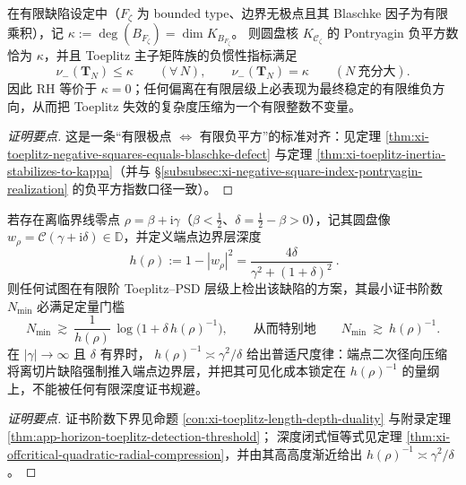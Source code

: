 \begin{conclusion}\label{con:xi-toeplitz-negative-square-stability-law}
在有限缺陷设定中（\(F_{\zeta}\) 为 bounded type、边界无极点且其 Blaschke 因子为有限乘积），记
\(\kappa:=\deg(B_{F_{\zeta}})=\dim K_{B_{F_{\zeta}}}\)。
则圆盘核 \(K_{\mathscr{C}_{\zeta}}\) 的 Pontryagin 负平方数恰为 \(\kappa\)，并且 Toeplitz 主子矩阵族的负惯性指标满足
\[
\nu_-(\mathbf{T}_N)\le \kappa\qquad(\forall\,N),
\qquad
\nu_-(\mathbf{T}_N)=\kappa\qquad(N\ \text{充分大}).
\]
因此 RH 等价于 \(\kappa=0\)；任何偏离在有限层级上必表现为最终稳定的有限维负方向，从而把 Toeplitz 失效的复杂度压缩为一个有限整数不变量。
\end{conclusion}
\begin{proof}[证明要点]
这是一条“有限极点 \(\Longleftrightarrow\) 有限负平方”的标准对齐：见定理 \ref{thm:xi-toeplitz-negative-squares-equals-blaschke-defect} 与定理 \ref{thm:xi-toeplitz-inertia-stabilizes-to-kappa}（并与 \S\ref{subsubsec:xi-negative-square-index-pontryagin-realization} 的负平方指数口径一致）。
\end{proof}

\begin{conclusion}\label{con:xi-endpoint-visibility-lower-bound-toeplitz-order}
若存在离临界线零点 \(\rho=\beta+\mathrm{i}\gamma\)（\(\beta<\tfrac12\)、\(\delta=\tfrac12-\beta>0\)），记其圆盘像 \(w_\rho=\mathcal{C}(\gamma+\mathrm{i}\delta)\in\mathbb{D}\)，并定义端点边界层深度
\[
\boxed{\ h(\rho):=1-|w_\rho|^2=\frac{4\delta}{\gamma^2+(1+\delta)^2}\ }.
\]
则任何试图在有限阶 Toeplitz--PSD 层级上检出该缺陷的方案，其最小证书阶数 \(N_{\min}\) 必满足定量门槛
\[
N_{\min}\ \gtrsim\ \frac{1}{h(\rho)}\,\log\!\bigl(1+\delta\,h(\rho)^{-1}\bigr),
\qquad\text{从而特别地}\qquad
N_{\min}\ \gtrsim\ h(\rho)^{-1}.
\]
在 \(|\gamma|\to\infty\) 且 \(\delta\) 有界时，
\(
h(\rho)^{-1}\asymp \gamma^2/\delta
\)
给出普适尺度律：端点二次径向压缩将离切片缺陷强制推入端点边界层，并把其可见化成本锁定在 \(h(\rho)^{-1}\) 的量纲上，不能被任何有限深度证书规避。
\end{conclusion}
\begin{proof}[证明要点]
证书阶数下界见命题 \ref{con:xi-toeplitz-length-depth-duality} 与附录定理 \ref{thm:app-horizon-toeplitz-detection-threshold}；
深度闭式恒等式见定理 \ref{thm:xi-offcritical-quadratic-radial-compression}，并由其高高度渐近给出 \(h(\rho)^{-1}\asymp \gamma^2/\delta\)。
\end{proof}


